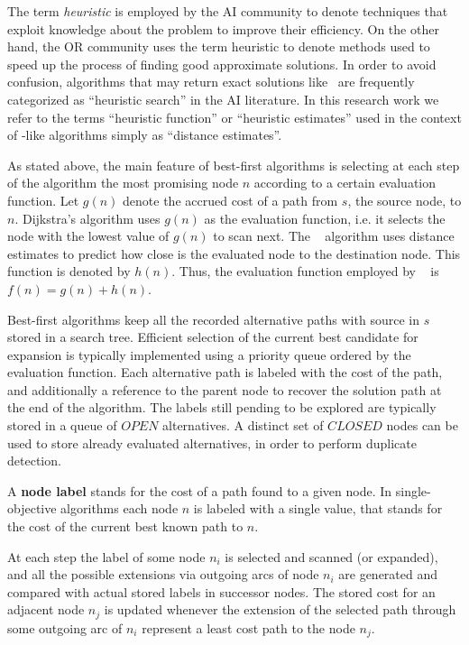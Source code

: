 The term \textit{heuristic} is employed by the \ac{AI} community to denote techniques that exploit knowledge about the problem to improve their efficiency. On the other hand, the \ac{OR} community uses the term heuristic to denote methods used to speed up the process of finding good approximate solutions. In order to avoid confusion, algorithms that may return exact solutions like \astar \ are frequently categorized as ``heuristic search'' in the AI literature. In this research work we refer to the terms ``heuristic function'' or ``heuristic estimates'' used in the context of \astar-like algorithms simply as ``distance estimates''.  

As stated above, the main feature of best-first algorithms is selecting at each step of the algorithm the most promising node $n$ according to a certain evaluation function. Let $g(n)$ denote the accrued cost of a path from $s$, the source node, to $n$. Dijkstra's algorithm uses $g(n)$ as the evaluation function, i.e. it selects the node with the lowest value of $g(n)$ to scan next. The \astar~ algorithm uses distance estimates to predict how close is the evaluated node to the destination node. This function is denoted by $h(n)$. Thus, the evaluation function employed by \astar~ is $f(n) = g(n) + h(n)$. 

Best-first algorithms keep all the recorded alternative paths with source in $s$ stored in a search tree. Efficient selection of the current best candidate for expansion is typically implemented using a priority queue ordered by the evaluation function. Each alternative path is labeled with the cost of the path, and additionally a reference to the parent node to recover the solution path at the end of the algorithm. The labels still pending to be explored are typically stored in a queue of $OPEN$ alternatives. A distinct set of $CLOSED$ nodes can be used to store already evaluated alternatives, in order to perform duplicate detection. 

\begin{defi}\label{chapMultiObjAlg:def:singleObjlabel}
A \textbf{node label} stands for the cost of a path found to a given node. In single-objective algorithms each node $n$ is labeled with a single value, that stands for the cost of the current best known path to $n$. 
\end{defi}

At each step the label of some node $n_i$ is selected and scanned (or expanded), and all the possible extensions via outgoing arcs of node $n_i$ are generated and compared with actual stored labels in successor nodes. The stored cost for an adjacent node $n_j$ is updated whenever the extension of the selected path through some outgoing arc of $n_i$ represent a least cost path to the node $n_j$.

